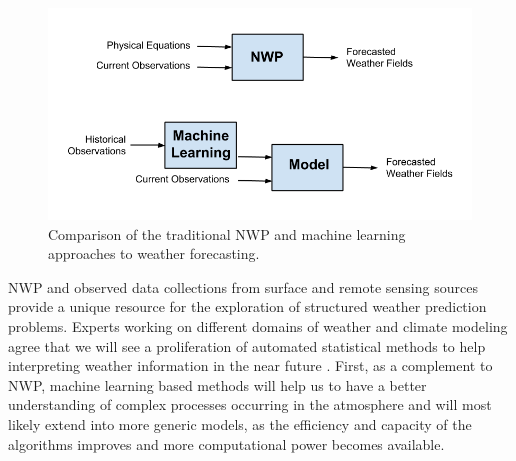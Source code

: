 \medskip

\begin{figure}[h]
 \centerline{\includegraphics[width=12cm]{nwp_vs_ml.png}} \caption{Comparison of the traditional NWP and machine learning approaches to weather forecasting.}\label{nwp_vs_ml}
\end{figure}

\medskip

NWP and observed data collections from surface and remote sensing sources provide a unique resource for the exploration of structured weather prediction problems. Experts working on different domains of weather and climate modeling agree that we will see a proliferation of automated statistical methods to help interpreting weather information in the near future \citep{jones2017ml}. First, as a complement to NWP, machine learning based methods will help us to have a better understanding of complex processes occurring in the atmosphere and will most likely extend into more generic models, as the efficiency and capacity of the algorithms improves and more computational power becomes available.

\medskip


